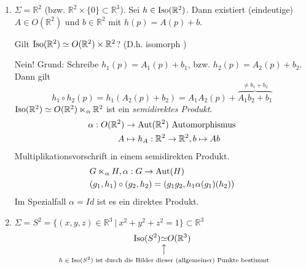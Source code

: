 \documentclass[../main.tex]{subfiles}
\begin{document}
\begin{examples}
    \leavevmode
    \begin{enumerate}
        \item $\Sigma = \mathbb{R}^2$ (bzw. $\mathbb{R}^2 \times \{0\} \subset \mathbb{R}^3$). Sei $h \in \operatorname{Iso}(\mathbb{R}^2)$.
        Dann existiert (eindeutige) $A \in O(\mathbb{R}^2)$ und $b\in \mathbb{R}^2$ mit $h(p)=A(p)+b$.
        \begin{question}
            Gilt $\operatorname{Iso}(\mathbb{R}^2) \simeq O(\mathbb{R}^2) \times \mathbb{R}^2$? (D.h. isomorph )    
        \end{question}
        Nein! Grund: Schreibe $h_{1}(p)=A_1(p)+b_1$, bzw. $h_{2}(p)=A_2(p)+b_2$.
        Dann gilt 
        $$h_1 \circ h_2 (p) = h_1(A_2(p)+b_2)=A_1A_2(p)+\overbrace{A_1b_2+b_1}^{\not = b_1+b_2}$$
        $\operatorname{Iso} (\mathbb{R}^2) \simeq O(\mathbb{R}^2) \ltimes_{\alpha} \mathbb{R}^2 $ ist ein \emph{semidirektes Produkt}.
        \begin{align*}
            \alpha : O(\mathbb{R}^2) &\to \operatorname{Aut}(\mathbb{R}^2) \text{ Automorphismus} \\
            A &\mapsto h_A : \mathbb{R}^2 \to \mathbb{R}^2, b \mapsto Ab
        \end{align*}
        Multiplikationsvorschrift in einem semidirekten Produkt.
        \begin{align*}
            &G \ltimes_{\alpha}H, \alpha:G \to \operatorname{Aut}(H) \\
            &(g_1,h_1) \circ (g_2,h_2) = (g_1g_2,h_1\alpha(g_1)(h_2))
        \end{align*}
        Im Spezialfall $\alpha = Id$ ist es ein direktes Produkt.

        \item $\Sigma = S^2 = \{(x,y,z)\in \mathbb{R}^3 \ | \ x^2 + y^2 + z^2 = 1 \} \subset \mathbb{R}^3$
        $$\Iso(S^2) \vertarrowbox[3ex]{\simeq}{$h \in \Iso(S^2)$ ist durch die Bilder dieser (allgemeiner) Punkte bestimmt} O(\mathbb{R}^3)$$


\end{enumerate}
\end{examples}
\end{document}

